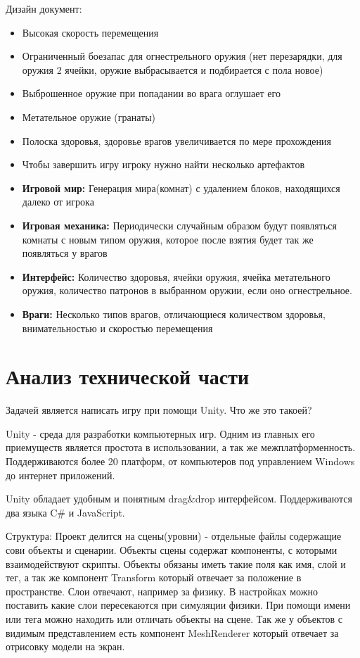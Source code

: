 \documentclass[14pt, titlepage,fleqn,a4paper]{extarticle}
\begin{document}
Дизайн документ:
\begin{itemize}
	\item Высокая скорость перемещения
	\item Ограниченный боезапас для огнестрельного оружия (нет перезарядки, для оружия 2 ячейки, оружие выбрасывается и подбирается с пола новое)
	\item Выброшенное оружие при попадании во врага оглушает его
	\item Метательное оружие (гранаты)
	\item Полоска здоровья, здоровье врагов увеличивается по мере прохождения
    \item Чтобы завершить игру игроку нужно найти несколько артефактов

	\item \textbf{Игровой мир:}
	Генерация мира(комнат) с удалением блоков, находящихся далеко от игрока 

	\item \textbf{Игровая механика:}
	Периодически случайным образом будут появляться комнаты с новым типом оружия, которое после взятия будет так же появляться у врагов

	\item \textbf{Интерфейс:}
	Количество здоровья, ячейки оружия, ячейка метательного оружия, количество патронов в выбранном оружии, если оно огнестрельное.

	\item \textbf{Враги:}
	Несколько типов врагов, отличающиеся количеством здоровья, внимательностью и скоростью перемещения
\end{itemize}
	\section*{Анализ технической части}

    Задачей является написать игру при помощи Unity. Что же это такоей?

Unity - среда для разработки компьютерных игр. Одним из главных его приемуществ является простота в использовании, а так же межплатформенность. Поддерживаются более 20 платформ, от компьютеров под управлением Windows до интернет приложений.

Unity обладает удобным и понятным drag\&drop интерфейсом. Поддерживаются два языка C\# и JavaScript.

Структура:
	Проект делится на сцены(уровни) - отдельные файлы содержащие сови объекты и сценарии.
	Объекты сцены содержат компоненты, с которыми взаимодействуют скрипты. Объекты обязаны иметь такие поля как имя, слой и тег, а так же компонент Transform который отвечает за положение в пространстве. Слои отвечают, например за физику. В настройках можно поставить какие слои пересекаются при симуляции физики. При помощи имени или тега можно находить или отличать объекты на сцене. Так же у объектов с видимым представлением есть компонент MeshRenderer который отвечает за отрисовку модели на экран.
\end{document}

